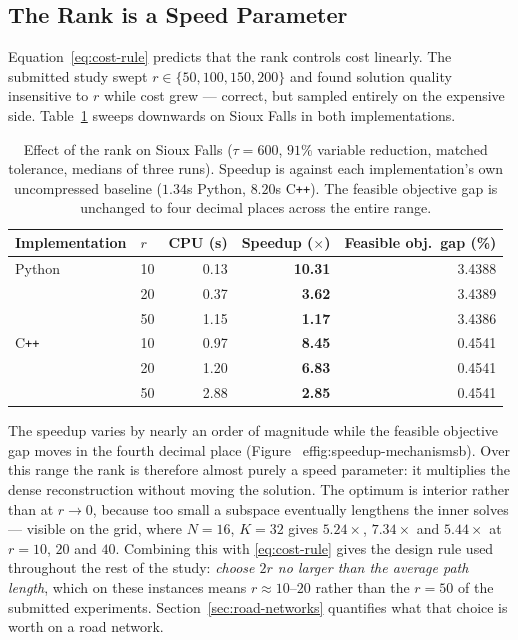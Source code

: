 \documentclass[11pt]{article}
\begin{document}
\subsection{The Rank is a Speed Parameter}
\label{sec:rank}


Equation~\eqref{eq:cost-rule} predicts that the rank controls cost linearly. The submitted
study swept $r\in\{50,100,150,200\}$ and found solution quality insensitive to $r$ while cost
grew --- correct, but sampled entirely on the expensive side. Table~\ref{tab:impact-rank}
sweeps downwards on Sioux Falls in both implementations.

\begin{table}[h]
\centering
\caption{Effect of the rank on Sioux Falls ($\tau=600$, $91\%$ variable
reduction, matched tolerance, medians of three runs). Speedup is against each
implementation's own uncompressed baseline ($1.34$s Python, $8.20$s C\texttt{++}). The
feasible objective gap is unchanged to four decimal places across the entire range.}
\label{tab:impact-rank}
{\small
\begin{tabular}{llrrr}
\toprule
Implementation & $r$ & CPU (s) & \textbf{Speedup} ($\times$) & Feasible obj.\ gap (\%)\\
\midrule
Python & 10 & 0.13 & \textbf{10.31} & 3.4388\\
       & 20 & 0.37 & \textbf{3.62}  & 3.4389\\
       & 50 & 1.15 & \textbf{1.17}  & 3.4386\\
\midrule
C\texttt{++} & 10 & 0.97 & \textbf{8.45} & 0.4541\\
             & 20 & 1.20 & \textbf{6.83} & 0.4541\\
             & 50 & 2.88 & \textbf{2.85} & 0.4541\\
\bottomrule
\end{tabular}}
\end{table}

The speedup varies by nearly an order of magnitude while the feasible objective gap moves in
the fourth decimal place (Figure~
ef{fig:speedup-mechanisms}b). Over this range the rank is therefore almost purely a speed
parameter: it multiplies the dense reconstruction without moving the solution. The optimum is
interior rather than at $r\to0$, because too small a subspace eventually lengthens the inner
solves --- visible on the grid, where $N=16$, $K=32$ gives $5.24\times$, $7.34\times$ and
$5.44\times$ at $r=10$, $20$ and $40$. Combining this with \eqref{eq:cost-rule} gives the
design rule used throughout the rest of the study: \emph{choose $2r$ no larger than the
average path length}, which on these instances means $r\approx10$--$20$ rather than the
$r=50$ of the submitted experiments. Section~\ref{sec:road-networks} quantifies what that
choice is worth on a road network.
\end{document}
